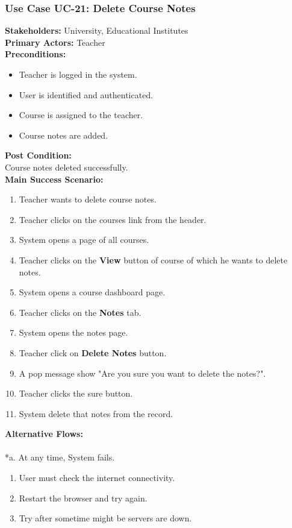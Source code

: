 \documentclass[12pt]{article}
\begin{document}
\subsubsection{Use Case UC-21: Delete Course Notes}
\textbf{Stakeholders: } University, Educational Institutes \\
\textbf{Primary Actors: }Teacher \\
\textbf{Preconditions:}
\begin{itemize}
\item Teacher is logged in the system.
\item User is identified and authenticated.
\item Course is assigned to the teacher.
\item Course notes are added.
\end{itemize}
\textbf{Post Condition: }\\
Course notes deleted successfully.\\
\textbf{Main Success Scenario:}
\begin{enumerate}
\item Teacher wants to delete course notes.
\item Teacher clicks on the courses link from the header.
\item System opens a page of all courses.
\item Teacher clicks on the \textbf{View} button of course of which he wants to delete notes.
\item System opens a course dashboard page.
\item Teacher clicks on the \textbf{Notes} tab.
\item System opens the notes page.
\item Teacher click on \textbf{Delete Notes} button.
\item A pop message show "Are you sure you want to delete the notes?".
\item Teacher clicks the sure button.
\item System delete that notes from the record.
\end{enumerate}
\textbf{Alternative Flows:}\\
\\
*a. At any time, System fails.
\begin{enumerate}
\item User must check the internet connectivity.
\item Restart the browser and try again.
\item Try after sometime might be servers are down.
\end{enumerate}
\end{document}

